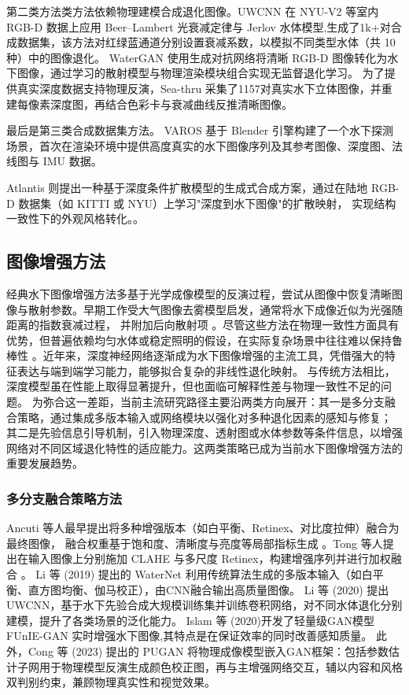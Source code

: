 \documentclass[twocolumn]{article}
\begin{document}
第二类方法类方法依赖物理建模合成退化图像。UWCNN \cite{ref5} 在 NYU-V2 等室内 RGB-D 数据上应用 Beer–Lambert 光衰减定律与 Jerlov 水体模型,生成了1k+对合成数据集，该方法对红绿蓝通道分别设置衰减系数，以模拟不同类型水体（共 10 种）中的图像退化。
WaterGAN \cite{ref6} 使用生成对抗网络将清晰 RGB-D 图像转化为水下图像，通过学习的散射模型与物理渲染模块组合实现无监督退化学习。
为了提供真实深度数据支持物理反演，Sea-thru \cite{ref7} 采集了1157对真实水下立体图像，并重建每像素深度图，再结合色彩卡与衰减曲线反推清晰图像。


最后是第三类合成数据集方法。
VAROS \cite{ref8} 基于 Blender 引擎构建了一个水下探测场景，首次在渲染环境中提供高度真实的水下图像序列及其参考图像、深度图、法线图与 IMU 数据。

Atlantis \cite{ref9} 则提出一种基于深度条件扩散模型的生成式合成方案，通过在陆地 RGB-D 数据集（如 KITTI 或 NYU）上学习"深度到水下图像"的扩散映射，
实现结构一致性下的外观风格转化。。

\subsection{图像增强方法}
经典水下图像增强方法多基于光学成像模型的反演过程，尝试从图像中恢复清晰图像与散射参数。早期工作受大气图像去雾模型启发，通常将水下成像近似为光强随距离的指数衰减过程，
并附加后向散射项 \cite{ref1}。尽管这些方法在物理一致性方面具有优势，但普遍依赖均匀水体或稳定照明的假设，在实际复杂场景中往往难以保持鲁棒性 \cite{ref8}。近年来，深度神经网络逐渐成为水下图像增强的主流工具，凭借强大的特征表达与端到端学习能力，能够拟合复杂的非线性退化映射。
与传统方法相比，深度模型虽在性能上取得显著提升，但也面临可解释性差与物理一致性不足的问题。
为弥合这一差距，当前主流研究路径主要沿两类方向展开：其一是多分支融合策略，通过集成多版本输入或网络模块以强化对多种退化因素的感知与修复；
其二是先验信息引导机制，引入物理深度、透射图或水体参数等条件信息，以增强网络对不同区域退化特性的适应能力。这两类策略已成为当前水下图像增强方法的重要发展趋势。

\subsubsection{多分支融合策略方法}
Ancuti 等人最早提出将多种增强版本（如白平衡、Retinex、对比度拉伸）融合为最终图像，
融合权重基于饱和度、清晰度与亮度等局部指标生成 \cite{ref16}。Tong 等人提出在输入图像上分别施加 CLAHE 与多尺度 Retinex，构建增强序列并进行加权融合 \cite{ref17}。
Li 等 (2019) 提出的 WaterNet 利用传统算法生成的多版本输入（如白平衡、直方图均衡、伽马校正），由CNN融合输出高质量图像。
Li 等 (2020) 提出 UWCNN，基于水下先验合成大规模训练集并训练卷积网络，对不同水体退化分别建模，提升了各类场景的泛化能力。
Islam 等 (2020)开发了轻量级GAN模型 FUnIE-GAN 实时增强水下图像,其特点是在保证效率的同时改善感知质量。
此外，Cong 等 (2023) 提出的 PUGAN 将物理成像模型嵌入GAN框架：包括参数估计子网用于物理模型反演生成颜色校正图，再与主增强网络交互，辅以内容和风格双判别约束，兼顾物理真实性和视觉效果。
\end{document}
